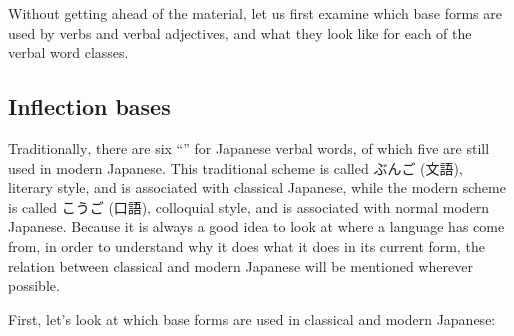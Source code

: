 \documentclass[11pt, b5paper, twoside, openright, onecolumn]{book}
\makeatletter
\newcommand*{\rubystack}[2]{{\relscale{0.5}%
  \begin{tabular}[b]{@{}c@{}}%
    {#1}\\%
   {\textscale{2}{#2}}%
  \end{tabular}}%
}
\DeclareRobustCommand*{\ruby}[2]{%
  \mbox{%
    \setlength{\parskip}{0ex}%
    \BeginAccSupp{method=pdfstringdef,ActualText={#1}}%
      \rubystack{\phantom{#2}}{#1}%
      \llap{%
        \rubystack{#2}{\phantom{#1}}%
      }%
    \EndAccSupp{}%
  }%
}
\renewcommand*{\ruby}[2]{#2 (#1)}%
\makeatother
\begin{document}
Without getting ahead of the material‚ let us first examine which base forms are used by verbs and verbal adjectives‚ and what they look like for each of the verbal word classes.

\subsection{Inflection bases}

Traditionally‚ there are six “” for Japanese verbal words‚ of which five are still used in modern Japanese. This traditional scheme is called \ruby{文語}{ぶんご}‚ literary style‚ and is associated with classical Japanese‚ while the modern scheme is called \ruby{口語}{こうご}‚ colloquial style‚ and is associated with normal modern Japanese. Because it is always a good idea to look at where a language has come from‚ in order to understand why it does what it does in its current form‚ the relation between classical and modern Japanese will be mentioned wherever possible.

First‚ let’s look at which base forms are used in classical and modern Japanese:
\end{document}
